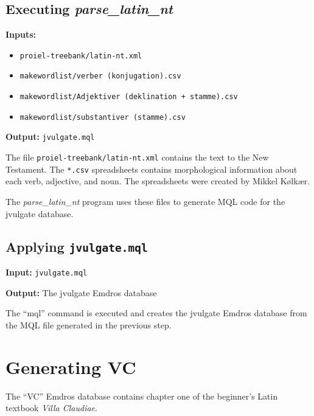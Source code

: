 \documentclass[11pt,oneside,a4paper,article]{memoir}
\begin{document}
\section{Executing \emph{parse\_latin\_nt}}

\noindent \textbf{Inputs:}

\begin{itemize}
\item \texttt{proiel-treebank/latin-nt.xml}
\item \texttt{makewordlist/verber (konjugation).csv}
\item \texttt{makewordlist/Adjektiver (deklination + stamme).csv}
\item \texttt{makewordlist/substantiver (stamme).csv}
\end{itemize}

\noindent \textbf{Output:} \texttt{jvulgate.mql}

\vspace{1ex}

\noindent
The file \texttt{proiel-treebank/latin-nt.xml} contains the text to the New Testament. The
\texttt{*.csv} spreadsheets contains morphological information about each verb, adjective, and noun.
The spreadsheets were created by Mikkel Kølkær.

The \emph{parse\_latin\_nt} program uses these files to generate MQL code for the jvulgate database.

\section{Applying \texttt{jvulgate.mql}}

\noindent \textbf{Input:} \texttt{jvulgate.mql}

\noindent \textbf{Output:} The jvulgate Emdros database

\vspace{1ex}

\noindent
The ``mql'' command is executed and creates the jvulgate Emdros database from the MQL file
generated in the previous step.



\chapter{Generating VC}

The ``VC'' Emdros database contains chapter one of the beginner's Latin textbook \emph{Villa Claudiae}.
\end{document}

